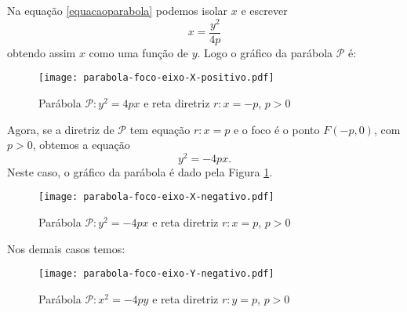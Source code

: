 Na equa\c{c}\~ao \eqref{equacaoparabola} podemos isolar $x$ e escrever
\[
  x = \dfrac{y^2}{4p}
\]
obtendo assim $x$ como uma fun\c{c}\~ao de $y$. Logo o gr\'afico da par\'abola $\mathcal{P}$ \'e:

\begin{figure}[!h]%
  \centering
  \caption{Par\'abola $\mathcal{P}: y^2 = 4px$ e reta diretriz $r: x = -p$, $p > 0$}
  \texttt{[image: parabola-foco-eixo-X-positivo.pdf]}
\end{figure}

Agora, se a diretriz de $\mathcal{P}$ tem equa\c{c}\~ao $r: x = p$ e o foco \'e o ponto $F(-p,0)$, com $p > 0$, obtemos a equa\c{c}\~ao
\[
  y^2 = -4px.
\]
Neste caso, o gr\'afico da par\'abola \'e dado pela Figura \ref{FormageralParabola}.
\begin{figure}[!h]%
  \centering
  \caption{Par\'abola $\mathcal{P}: y^2 = -4px$ e reta diretriz $r: x = p$, $p > 0$}
  \label{FormageralParabola}
  \texttt{[image: parabola-foco-eixo-X-negativo.pdf]}
\end{figure}

Nos demais casos temos:
\begin{figure}[!h]%
  \centering
  \caption{Par\'abola $\mathcal{P}: x^2 = -4py$ e reta diretriz $r: y = p$, $p > 0$}
  \texttt{[image: parabola-foco-eixo-Y-negativo.pdf]}
\end{figure}

